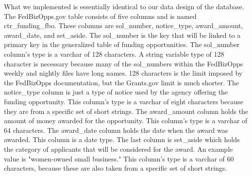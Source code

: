 \documentclass[onecolumn]{IEEEtran}
\begin{document}
What we implemented is essentially identical to our data design of the database. The FedBizOpps.gov table consists of five columns and is named ctr\_funding\_fbo. These columns are sol\_number, notice\_type, award\_amount, award\_date, and set\_aside. The sol\_number is the key that will be linked to a primary key in the generalized table of funding opportunities. The sol\_number column's type is a varchar of 128 characters. A string variable type of 128 character is necessary because many of the sol\_numbers within the FedBizOpps weekly and nightly files have long names. 128 characters is the limit imposed by the FedBizOpps documentation, but the Grants.gov limit is much shorter. The notice\_type column is just a type of notice used by the agency offering the funding opportunity. This column's type is a varchar of eight characters because they are from a specific set of short strings. The award\_amount column holds the amount of money awarded for the opportunity. This column's type is a varchar of 64 characters. The award\_date column holds the date when the award was awarded. This column is a date type. The last column is set\_aside which holds the category of applicants that will be considered for the award. An example value is "women-owned small business." This column's type is a varchar of 60 characters, because these are also taken from a specific set of short strings.
\end{document}
